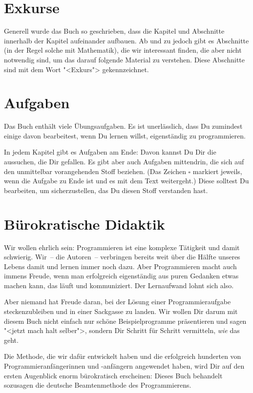 \section{Exkurse}

Generell wurde das Buch so geschrieben, dass die Kapitel und
Abschnitte innerhalb der Kapitel aufeinander aufbauen.  Ab und zu
jedoch gibt es Abschnitte (in der Regel solche mit Mathematik), die
wir interessant finden, die aber nicht notwendig sind, um das darauf
folgende Material zu verstehen.  Diese Abschnitte sind mit dem Wort
"<Exkurs"> gekennzeichnet.

\section{Aufgaben}

Das Buch enthält viele Übungsaufgaben.  Es ist unerlässlich, dass Du
zumindest einige davon bearbeitest, wenn Du lernen willst,
eigenständig zu programmieren.

In jedem Kapitel gibt es Aufgaben am Ende: Davon kannst Du Dir die
aussuchen, die Dir gefallen.  Es gibt aber auch Aufgaben mittendrin,
die sich auf den unmittelbar vorangehenden Stoff beziehen.  (Das
Zeichen \(\square\) markiert jeweils, wenn die Aufgabe zu Ende ist und es
mit dem Text weitergeht.)  Diese
solltest Du bearbeiten, um sicherzustellen, das Du diesen Stoff
verstanden hast.

\section{Bürokratische Didaktik}

Wir wollen ehrlich sein: Programmieren ist eine komplexe Tätigkeit und
damit schwierig.  Wir~-- die Autoren~-- verbringen bereits weit über
die Hälfte unseres Lebens damit und lernen immer noch dazu.  Aber
Programmieren macht auch immens Freude, wenn man erfolgreich
eigenständig aus puren Gedanken etwas machen kann, das läuft und
kommuniziert.  Der Lernaufwand lohnt sich also.

Aber niemand hat Freude daran, bei der Lösung einer Programmieraufgabe
steckenzubleiben und in einer Sackgasse zu landen.  Wir wollen Dir
darum mit diesem Buch nicht einfach nur schöne Beispielprogramme
präsentieren und sagen "<jetzt mach halt selber">, sondern Dir Schritt
für Schritt vermitteln, \emph{wie} das geht.

Die Methode, die wir dafür entwickelt haben und die erfolgreich
hunderten von Programmieranfängerinnen und -anfängern angewendet
haben, wird Dir auf den ersten Augenblick enorm bürokratisch
erscheinen: Dieses Buch behandelt sozusagen die deutsche
Beamtenmethode des Programmierens.


